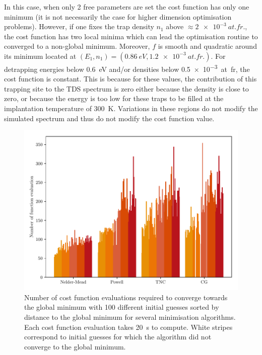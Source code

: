 In this case, when only 2 free parameters are set the cost function has only one minimum (it is not necessarily the case for higher dimension optimisation problems).
However, if one fixes the trap density $n_1$ above $\approx \SI{2e-3}{at.fr.}$, the cost function has two local minima which can lead the optimisation routine to converged to a non-global minimum.
Moreover, $f$ is smooth and quadratic around its minimum located at $(E_1, n_1) = (\SI{0.86}{eV}, \SI{1.2e-3}{at.fr.})$.
For detrapping energies below \SI{0.6}{eV} and/or densities below \SI{0.5e-3}{at.fr}, the cost function is constant.
This is because for these values, the contribution of this trapping site to the TDS spectrum is zero either because the density is close to zero, or because the energy is too low for these traps to be filled at the implantation temperature of \SI{300}{K}.
Variations in these regions do not modify the simulated spectrum and thus do not modify the cost function value.

\begin{figure} [ht]
    \centering
    \includegraphics[width=\linewidth]{Figures/Chapter3/Parametric_optimisation/algorithms_perfs.pdf}
    \caption{Number of cost function evaluations required to converge towards the global minimum with 100 different initial guesses sorted by distance to the global minimum for several minimisation algorithms. Each cost function evaluation takes \SI{20}{s} to compute. White stripes correspond to initial guesses for which the algorithm did not converge to the global minimum.}
    \label{fig:algos perfs}
\end{figure}


